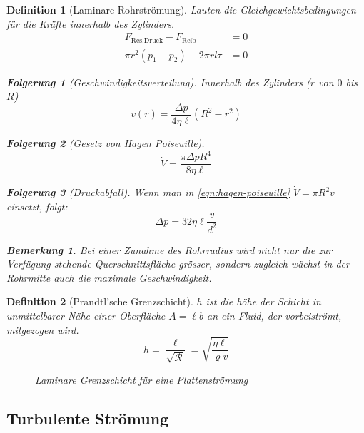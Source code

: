 \documentclass[a4paper, twocolumn]{article}
\numberwithin{equation}{section}
\theoremstyle{hsr-def}
\newtheorem{definition}{Definition}[section]
\theoremstyle{hsr-sub}
\newtheorem{result}{Folgerung}[definition]
\newtheorem{remark}{Bemerkung}[definition]
\begin{document}
\begin{definition}[Laminare Rohrstr\"omung]
Lauten die Gleichgewichtsbedingungen f\"ur die Kr\"afte innerhalb des Zylinders.
\begin{align*}
    F_\text{Res,Druck} - F_\text{Reib} & = 0 \\
    \pi r^2 (p_1 - p_2) - 2\pi rl\tau &= 0
\end{align*}

\begin{result}[Geschwindigkeitsverteilung] 
Innerhalb des Zylinders (\(r\) von \(0\) bis \(R\))
\[
    v(r) = \frac{\Delta p}{4\eta\ell}\left(R^2-r^2\right)
\]
\end{result}

\begin{result}[Gesetz von Hagen Poiseuille]
\begin{equation} \label{eqn:hagen-poiseuille}
    \dot{V} = \frac{\pi\Delta p R^4}{8\eta\ell}
\end{equation}
\end{result}

\begin{result}[Druckabfall]
Wenn man in \eqref{eqn:hagen-poiseuille} \(\dot{V} = \pi R^2 v\) einsetzt, folgt:
\[
    \Delta p = 32\eta\ell \frac{v}{d^2}
\]
\end{result}

\begin{remark}
Bei einer Zunahme des Rohrradius wird nicht nur die zur Verf\"ugung stehende Querschnittsfl\"ache gr\"osser, sondern zugleich w\"achst in der Rohrmitte auch die maximale Geschwindigkeit.
\end{remark}
\end{definition}

\begin{definition}[Prandtl'sche Grenzschicht]
\(h\) ist die h\"ohe der Schicht in unmittelbarer N\"ahe einer Oberfl\"ache \(A = \ell b\) an ein Fluid, der vorbeistr\"omt, mitgezogen wird.
\[
    h = \frac{\ell}{\sqrt{\mathcal{R}}} =  \sqrt{\frac{\eta\ell}{\varrho v}}
\]
\begin{figure}[h] \centering

\caption{Laminare Grenzschicht f\"ur eine Plattenstr\"omung}
\end{figure}
\end{definition}

\subsection{Turbulente Str\"omung}
\end{document}
